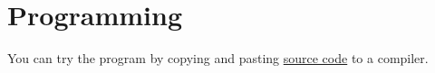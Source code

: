 \section{Programming}

You can try the program by copying and pasting \href{https://github.com/gnguyenanhthu/MATH2600/blob/6de4c481e0d8a23df3e410722f302c881bbc0211/Project%201/SleepingHoursCalculator.java}{source code} to a compiler.